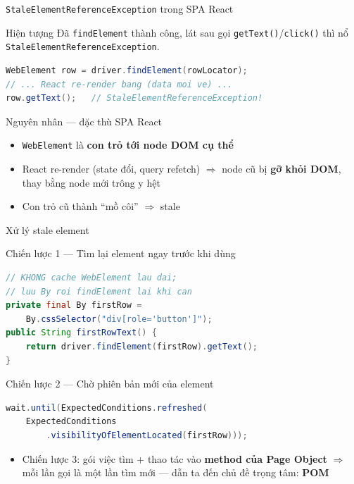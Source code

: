 \documentclass[aspectratio=169,12pt]{beamer}
\begin{document}
\begin{frame}[fragile]{\texttt{StaleElementReferenceException} trong SPA React}
  \begin{block}{Hiện tượng}
    Đã \texttt{findElement} thành công, lát sau gọi
    \texttt{getText()}/\texttt{click()} thì nổ
    \texttt{StaleElementReferenceException}.
  \end{block}

\begin{lstlisting}[language=Java]
WebElement row = driver.findElement(rowLocator);
// ... React re-render bang (data moi ve) ...
row.getText();   // StaleElementReferenceException!
\end{lstlisting}

  \begin{alertblock}{Nguyên nhân --- đặc thù SPA React}
    \begin{itemize}
      \item \texttt{WebElement} là \textbf{con trỏ tới node DOM cụ thể}
      \item React re-render (state đổi, query refetch) $\Rightarrow$
            node cũ bị \textbf{gỡ khỏi DOM}, thay bằng node mới
            trông y hệt
      \item Con trỏ cũ thành ``mồ côi'' $\Rightarrow$ stale
    \end{itemize}
  \end{alertblock}
\end{frame}

\begin{frame}[fragile]{Xử lý stale element}
  \begin{exampleblock}{Chiến lược 1 --- Tìm lại element ngay trước khi dùng}
\begin{lstlisting}[language=Java]
// KHONG cache WebElement lau dai;
// luu By roi findElement lai khi can
private final By firstRow =
    By.cssSelector("div[role='button']");
public String firstRowText() {
    return driver.findElement(firstRow).getText();
}
\end{lstlisting}
  \end{exampleblock}

  \begin{exampleblock}{Chiến lược 2 --- Chờ phiên bản mới của element}
\begin{lstlisting}[language=Java]
wait.until(ExpectedConditions.refreshed(
    ExpectedConditions
        .visibilityOfElementLocated(firstRow)));
\end{lstlisting}
  \end{exampleblock}

  \begin{itemize}
    \item Chiến lược 3: gói việc tìm + thao tác vào \textbf{method của
          Page Object} $\Rightarrow$ mỗi lần gọi là một lần tìm mới
          --- dẫn ta đến chủ đề trọng tâm: \textbf{POM}
  \end{itemize}
\end{frame}
\end{document}
